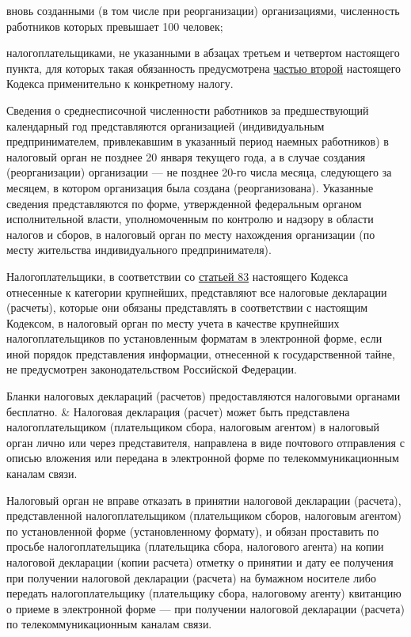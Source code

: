 \documentclass[a4page]{report}
\begin{document}
\par вновь созданными (в том числе при реорганизации) организациями, численность работников которых превышает 100 человек;
\par налогоплательщиками, не указанными в абзацах третьем и четвертом настоящего пункта, для которых такая обязанность предусмотрена \uline{частью второй} настоящего Кодекса применительно к конкретному налогу.
\par Сведения о среднесписочной численности работников за предшествующий календарный год представляются организацией (индивидуальным предпринимателем, привлекавшим в указанный период наемных работников) в налоговый орган не позднее 20 января текущего года, а в случае создания (реорганизации) организации --- не позднее 20-го числа месяца, следующего за месяцем, в котором организация была создана (реорганизована). Указанные сведения представляются по форме, утвержденной федеральным органом исполнительной власти, уполномоченным по контролю и надзору в области налогов и сборов, в налоговый орган по месту нахождения организации (по месту жительства индивидуального предпринимателя).
\par Налогоплательщики, в соответствии со \uline{статьей 83} настоящего Кодекса отнесенные к категории крупнейших, представляют все налоговые декларации (расчеты), которые они обязаны представлять в соответствии с настоящим Кодексом, в налоговый орган по месту учета в качестве крупнейших налогоплательщиков по установленным форматам в электронной форме, если иной порядок представления информации, отнесенной к государственной тайне, не предусмотрен законодательством Российской Федерации.
\par Бланки налоговых деклараций (расчетов) предоставляются налоговыми органами бесплатно.
& Налоговая декларация (расчет) может быть представлена налогоплательщиком (плательщиком сбора, налоговым агентом) в налоговый орган лично или через представителя, направлена в виде почтового отправления с описью вложения или передана в электронной форме по телекоммуникационным каналам связи.
\par Налоговый орган не вправе отказать в принятии налоговой декларации (расчета), представленной налогоплательщиком (плательщиком сборов, налоговым агентом) по установленной форме (установленному формату), и обязан проставить по просьбе налогоплательщика (плательщика сбора, налогового агента) на копии налоговой декларации (копии расчета) отметку о принятии и дату ее получения при получении налоговой декларации (расчета) на бумажном носителе либо передать налогоплательщику (плательщику сбора, налоговому агенту) квитанцию о приеме в электронной форме --- при получении налоговой декларации (расчета) по телекоммуникационным каналам связи.
\end{document}
